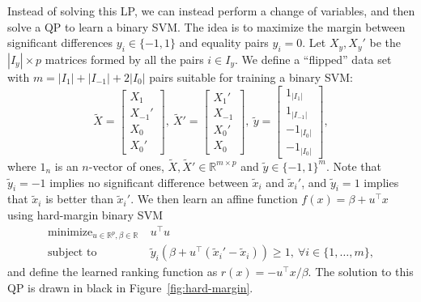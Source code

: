 \documentclass{article}
\newcommand{\RR}{\mathbb R}
\DeclareMathOperator*{\minimize}{minimize}
\begin{document}
\begin{figure*}[b!]
  \centering
  
  \vskip -0.5cm
  \caption{The separable LP and QP comparison problems. \textbf{Left}:
    the difference vectors $x'-x$ of the original data and the optimal
    solution to the LP (\ref{eq:max-margin-lp}). \textbf{Middle}: for
    the unscaled flipped data $\tilde x'-\tilde x$ (\ref{eq:tilde}),
    the LP is not the same as the QP
    (\ref{eq:max-margin-qp-tilde}). \textbf{Right}: for the scaled flipped
    data, the QP is equivalent to the LP.}
  \label{fig:hard-margin}
\end{figure*}

Instead of solving this LP, we can instead perform a change of
variables, and then solve a QP to learn a binary SVM. The idea is to
maximize the margin between significant differences $y_i\in\{-1,1\}$
and equality pairs $y_i=0$. Let $X_y,X_y'$ be the $|I_y|\times p$
matrices formed by all the pairs $i\in I_y$. We define a
``flipped'' data set with $m=|I_1|+|I_{-1}|+2|I_0|$ pairs suitable for
training a binary SVM:
\begin{equation}
\label{eq:tilde}
  \tilde X = \left[
    \begin{array}{c}
      X_1 \\
      X_{-1}'\\
      X_0\\
      X_0'
    \end{array}
  \right],\ 
  \tilde X' = \left[
    \begin{array}{c}
      X_1' \\
      X_{-1}\\
      X_0'\\
      X_0
    \end{array}
  \right],\ 
  \tilde y = \left[
    \begin{array}{c}
      1_{|I_1|} \\
      1_{|I_{-1}|}\\
      -1_{|I_0|}\\
      -1_{|I_0|}
    \end{array}
  \right],
\end{equation}
where $1_n$ is an $n$-vector of ones, $\tilde X,\tilde
X'\in\RR^{m\times p}$ and $\tilde y\in\{-1,1\}^m$. Note that $\tilde
y_i=-1$ implies no significant difference between $\tilde x_i$ and
$\tilde x_i'$, and $\tilde y_i=1$ implies that $\tilde x_i$ is better
than $\tilde x_i'$. We then learn an affine function
$f(x)=\beta+u^\intercal x$ using hard-margin binary SVM
\begin{equation}
  \label{eq:max-margin-qp-tilde}
  \begin{aligned}
    \minimize_{u\in\RR^p, \beta\in\RR}\ & u^\intercal u  \\
    \text{subject to}\ & 
    \tilde y_i (\beta + u^\intercal( \tilde x_i'-\tilde x_i) ) \geq 1,
    \ \forall i\in\{1,\dots,m\},
  \end{aligned}
\end{equation}
and define the learned ranking function as $r(x) = -u^\intercal
x/\beta$. The solution to this QP is drawn in
black in Figure~\ref{fig:hard-margin}.
\end{document}
